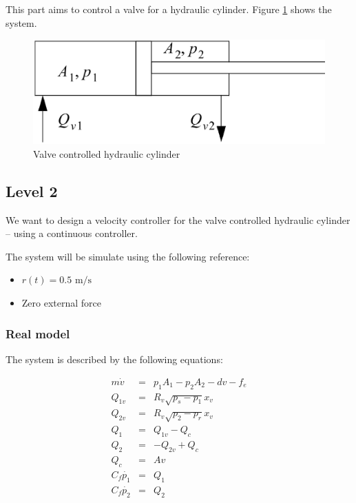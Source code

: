 This part aims to control a valve for a hydraulic cylinder. Figure \ref{valve} shows the system. 

\begin{figure}[hb]
 \includegraphics[width=\linewidth]{fig/valve.ps}
 \caption{Valve controlled hydraulic cylinder}
 \label{valve}
\end{figure}

\subsection*{Level 2}

We want to design a velocity controller for the valve controlled hydraulic cylinder -- using a continuous controller. 

The system will be simulate using the following reference:
\begin{itemize}
 \item $r(t) = 0.5 \text{ m/s}$
 \item Zero external force
\end{itemize}


\subsubsection*{Real model}
The system is described by the following equations:

$$
\begin{array}{rcl}
    m \dot{v} & = & p_1 A_1 - p_2 A_2 - d v - f_e \\
    Q_{1v} & = & R_v \sqrt{p_s - p_1} x_v \\
    Q_{2v} & = & R_v \sqrt{p_2 - p_r} x_v \\
    Q_1 & = & Q_{1v} - Q_c \\
    Q_2 & = & - Q_{2v} + Q_c \\
    Q_c & = & A v \\
    C_f \dot{p_1} & = & Q_1 \\
    C_f \dot{p_2} & = & Q_2 \\
\end{array}
$$

